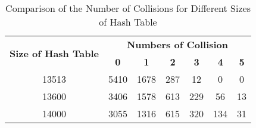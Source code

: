 \documentclass[a4paper,11pt]{article}
\begin{document}
\begin{table}[h!]
  \centering
  \begin{tabular}{|c|c|c|c|c|c|c|}
    \hline
    \multirow{2}{*}{\textbf{Size of Hash Table}} & \multicolumn{6}{c|}{\textbf{Numbers of Collision}} \\ 
    \cline{2-7} & \textbf{0} & \textbf{1} & \textbf{2} & \textbf{3} & \textbf{4} & \textbf{5} \\ \hline
    13513 & 5410 & 1678 & 287 & 12 & 0 & 0 \\ \hline
    13600 & 3406 & 1578 & 613 & 229 & 56 & 13 \\ \hline
    14000 & 3055 & 1316 & 615 & 320 & 134 & 31 \\ \hline
  \end{tabular}
  \caption{Comparison of the Number of Collisions for Different Sizes of Hash Table}
  \label{table:collisions}
\end{table}

\subsection*{}
\end{document}
